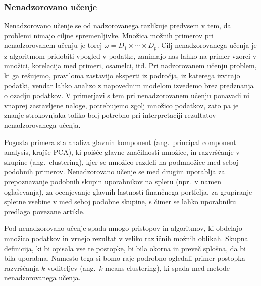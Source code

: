 \documentclass[12pt,a4paper,twoside]{article}
\theoremstyle{definition} %
\theoremstyle{plain} %
\numberwithin{equation}{section}  %
\begin{document}

\subsubsection{Nenadzorovano učenje}

Nenadzorovano učenje se od nadzorovanega razlikuje predvsem v tem, da problemi nimajo ciljne spremenljivke. 
Množica možnih primerov pri nenadzorovanem učenju je torej $\omega = D_1 \times \cdots \times D_p$.
Cilj nenadzorovanega učenja je z algoritmom pridobiti vpogled v podatke, zanimajo nas lahko na primer vzorci v množici, korelacija med primeri, osamelci, itd.
Pri nadzorovanem učenju problem, ki ga rešujemo, praviloma zastavijo eksperti iz področja, iz katerega izvirajo podatki, vendar lahko analizo z napovednim modelom izvedemo brez predznanja o ozadju podatkov.
V primerjavi s tem pri nenadzorovanem učenju ponavadi ni vnaprej zastavljene naloge, potrebujemo zgolj množico podatkov, zato pa je znanje strokovnjaka toliko bolj potrebno pri interpretaciji rezultatov nenadzorovanega učenja.

Pogosta primera sta analiza glavnih komponent (ang.~principal component analysis, krajše PCA), ki poišče glavne značilnosti množice, 
in razvrščanje v skupine (ang.~clustering), kjer se množico razdeli na podmnožice med seboj podobnih primerov. 
Nenadzorovano učenje se med drugim uporablja za prepoznavanje podobnih skupin uporabnikov na spletu (npr.\ v namen oglaševanja), 
za ocenjevanje glavnih lastnosti finančnega portfelja, za grupiranje spletne vsebine v med seboj podobne skupine, s čimer se lahko uporabniku predlaga povezane artikle.

Pod nenadzorovano učenje spada mnogo pristopov in algoritmov, ki obdelajo množico podatkov in vrnejo rezultat v veliko različnih možnih oblikah. 
Skupna definicija, ki bi opisala vse te postopke, bi bila okorna in preveč splošna, da bi bila uporabna. 
Namesto tega si bomo raje podrobno ogledali primer postopka razvrščanja $k$-voditeljev (ang.~$k$-means clustering), ki spada med metode nenadzorovanega učenja.
\end{document}
